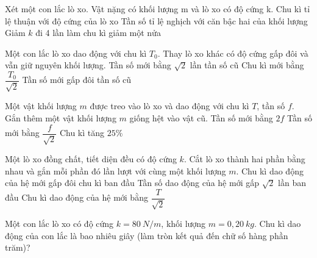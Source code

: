   \setcounter{ex}{0}
\PhanII
\begin{ex}
Xét một con lắc lò xo. Vật nặng có khối lượng m và lò xo có độ cứng k.
{Chu kì tỉ lệ thuận với độ cứng của lò xo}
{\True Tần số tỉ lệ nghịch với căn bậc hai của khối lượng}
{Giảm $k$ đi 4 lần làm chu kì giảm một nửa}
\loigiai{
\begin{itemchoice}
\itemch 
\itemch 
\itemch 
\itemch 
\end{itemchoice}
}
\end{ex}

\begin{ex}
Một con lắc lò xo dao động với chu kì $T_0$. Thay lò xo khác có độ cứng gấp đôi và vẫn giữ nguyên khối lượng.
{\True Tần số mới bằng $\sqrt{2}$ lần tần số cũ}
{\True Chu kì mới bằng $\dfrac{T_0}{\sqrt{2}}$}
{Tần số mới gấp đôi tần số cũ}
\loigiai{
\begin{itemchoice}
\itemch 
\itemch 
\itemch 
\itemch 
\end{itemchoice}
}
\end{ex}

\begin{ex}
Một vật khối lượng $m$ được treo vào lò xo và dao động với chu kì $T$, tần số $f$. Gắn thêm một vật khối lượng $m$ giống hệt vào vật cũ.
{Tần số mới bằng $2f$}
{\True Tần số mới bằng $\dfrac{f}{\sqrt{2}}$}
{Chu kì tăng $25\%$}
\loigiai{
\begin{itemchoice}
\itemch 
\itemch 
\itemch 
\itemch 
\end{itemchoice}
}
\end{ex}

\begin{ex}
Một lò xo đồng chất, tiết diện đều có độ cứng $k$. Cắt lò xo thành hai phần bằng nhau và gắn mỗi phần đó lần lượt với cùng một khối lượng $m$.
{Chu kì dao động của hệ mới gấp đôi chu kì ban đầu}
{\True Tần số dao động của hệ mới gấp $\sqrt{2}$ lần ban đầu}
{\True Chu kì dao động của hệ mới bằng $\dfrac{T}{\sqrt{2}}$}
\loigiai{
\begin{itemchoice}
\itemch 
\itemch 
\itemch 
\itemch 
\end{itemchoice}
}
\end{ex}

\setcounter{ex}{0}
\PhanIII
\begin{ex}
Một con lắc lò xo có độ cứng $k = 80\ N/m$, khối lượng $m = 0,20\ kg$. Chu kì dao động của con lắc là bao nhiêu giây (làm tròn kết quả đến chữ số hàng phần trăm)?
\loigiai{}
\end{ex}

